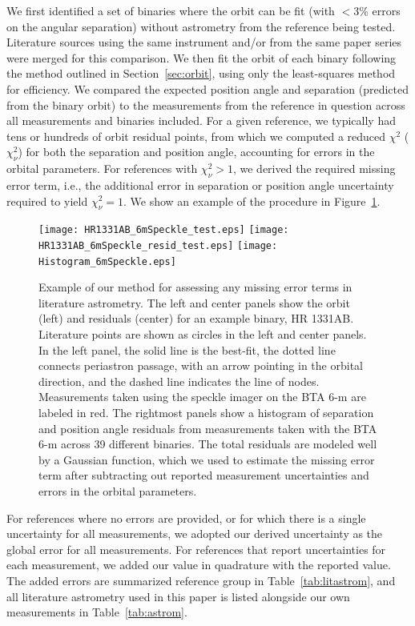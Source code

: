 \documentclass[twocolumn]{aastex62}
\begin{document}
We first identified a set of binaries where the orbit can be fit (with $<3\%$ errors on the angular separation) without astrometry from the reference being tested. Literature sources using the same instrument and/or from the same paper series were merged for this comparison. We then fit the orbit of each binary following the method outlined in Section~\ref{sec:orbit}, using only the least-squares method for efficiency. We compared the expected position angle and separation (predicted from the binary orbit) to the measurements from the reference in question across all measurements and binaries included. For a given reference, we typically had tens or hundreds of orbit residual points, from which we computed a reduced $\chi^2$ ($\chi^2_\nu$) for both the separation and position angle, accounting for errors in the orbital parameters. For references with $\chi^2_\nu > 1$, we derived the required missing error term, i.e., the additional error in separation or position angle uncertainty required to yield $\chi^2_\nu = 1$. We show an example of the procedure in Figure~\ref{fig:literr}. 


\begin{figure}[ht]
\begin{center}
\texttt{[image: HR1331AB\_6mSpeckle\_test.eps]}
\texttt{[image: HR1331AB\_6mSpeckle\_resid\_test.eps]}
\texttt{[image: Histogram\_6mSpeckle.eps]}
\caption{Example of our method for assessing any missing error terms in literature astrometry. The left and center panels show the orbit (left) and residuals (center) for an example binary, HR 1331AB. Literature points are shown as circles in the left and center panels. In the left panel, the solid line is the best-fit, the dotted line connects periastron passage, with an arrow pointing in the orbital direction, and the dashed line indicates the line of nodes. Measurements taken using the speckle imager on the BTA 6-m are labeled in red. The rightmost panels show a histogram of separation and position angle residuals from measurements taken with the BTA 6-m across 39 different binaries. The total residuals are modeled well by a Gaussian function, which we used to estimate the missing error term after subtracting out reported measurement uncertainties and errors in the orbital parameters. }
\label{fig:literr}
\end{center}
\end{figure}

For references where no errors are provided, or for which there is a single uncertainty for all measurements, we adopted our derived uncertainty as the global error for all measurements. For references that report uncertainties for each measurement, we added our value in quadrature with the reported value. The added errors are summarized reference group in Table~\ref{tab:litastrom}, and all literature astrometry used in this paper is listed alongside our own measurements in Table~\ref{tab:astrom}. 
\end{document}
